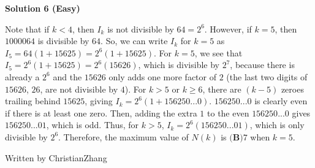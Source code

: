 \begin{enumerate}
\textbf{Solution 6 (Easy)}

Note that if $k<4$, then $I_k$ is not divisible by $64=2^6$. However, if $k=5$, then $1000064$ is divisible by $64$. So, we can write $I_k$ for $k=5$ as $I_5=64(1+15625)=2^6(1+15625)$. For $k=5$, we see that $I_5=2^6(1+15625)=2^6(15626)$, which is divisible by $2^7$, because there is already a $2^6$ and the $15626$ only adds one more factor of $2$ (the last two digits of $15626$, $26$, are not divisible by $4$). For $k>5$ or $k\geq6$, there are $(k-5)$ zeroes trailing behind $15625$, giving $I_k=2^6(1+156250...0)$. $156250...0$ is clearly even if there is at least one zero. Then, adding the extra $1$ to the even $156250...0$ gives $156250...01$, which is odd. Thus, for $k>5$, $I_k=2^6(156250...01)$, which is only divisible by $2^6$. Therefore, the maximum value of $N(k)$ is $\boxed{\textbf{(B)} 7}$ when $k=5$.

 Written by ChristianZhang

 


\end{enumerate}